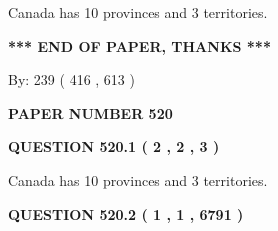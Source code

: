 \documentclass[12pt]{article}
\begin{document}
 
\noindent{}
 
 
Canada has 10  provinces and 3 territories.
 
 
 
 
   
   
 \vspace{0.2in}
 
   
   
   
   
\vspace{1.0in} 
{\textbf{\large{ *** END OF PAPER, THANKS *** }}} 
   
   
\hspace{1.0in} By: 
 239 ( 416 ,  613 )
   
   
   
   
\newpage 
\setcounter{page}{ 
   520001 } 
   
   
   
   
 {\textbf{ \Large{ PAPER NUMBER  520  }}}
   
   
\vspace{0.2in}
   
   
   
   
   
   
 \vspace{0.2in}
 
 
 
 
   
   
  
\vspace{0.2in}
  
{\textbf{\Large{QUESTION
520.1 
 ( 2 , 2 , 3 )
}}}
  
  
 
 
\noindent{}
 
 
Canada has 10  provinces and 3 territories.
 
 
 
 
  
\vspace{0.2in}
  
{\textbf{\Large{QUESTION
520.2 
 ( 1 , 1 , 6791 )
}}}
  
  
 
 
\noindent{}
\end{document}
